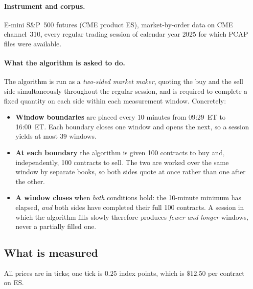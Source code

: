 \documentclass[11pt]{article}
\begin{document}
\paragraph{Instrument and corpus.} E-mini S\&P~500 futures (CME product ES),
market-by-order data on CME channel~310, every regular trading session of
calendar year 2025 for which PCAP files were available.

\paragraph{What the algorithm is asked to do.} The algorithm is run as a
\emph{two-sided market maker}, quoting the buy and the sell side simultaneously
throughout the regular session, and is required to complete a fixed quantity on
each side within each measurement window. Concretely:

\begin{itemize}[nosep,leftmargin=1.4em]
  \item \textbf{Window boundaries} are placed every 10 minutes from 09:29~ET to
        16:00~ET. Each boundary closes one window and opens the next, so a
        session yields at most 39 windows.
  \item \textbf{At each boundary} the algorithm is given 100 contracts to buy
        and, independently, 100 contracts to sell. The two are worked over the
        same window by separate books, so both sides quote at once rather than
        one after the other.
  \item \textbf{A window closes} when \emph{both} conditions hold: the 10-minute
        minimum has elapsed, \emph{and} both sides have completed their full 100
        contracts. A session in which the
        algorithm fills slowly therefore produces \emph{fewer and longer}
        windows, never a partially filled one.
\end{itemize}

\subsection{What is measured}
\label{sec:eval:measures}

All prices are in ticks; one tick is $0.25$ index points, which is
$\$12.50$ per contract on ES.
\end{document}
